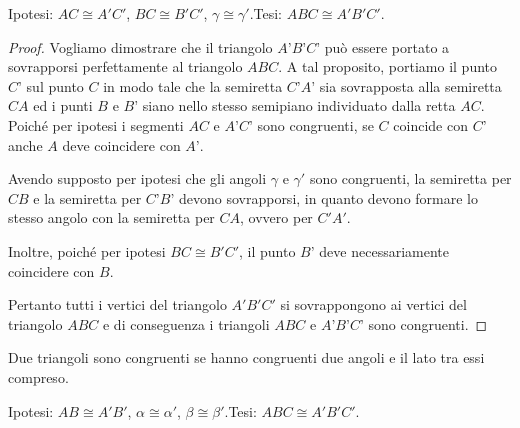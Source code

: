 \noindent Ipotesi: $AC\cong A'C'$, $BC\cong B'C'$, $\gamma \cong \gamma'$.\tab Tesi:  $ABC \cong A'B'C'$.

\begin{proof}
Vogliamo dimostrare che il triangolo $A’B’C’$ può essere portato a sovrapporsi perfettamente al triangolo $ABC$.
A tal proposito, portiamo il punto $C’$ sul punto $C$ in modo tale che la semiretta $C’A’$ sia sovrapposta alla semiretta $CA$ ed i punti $B$ e $B’$ siano nello stesso semipiano individuato dalla retta $AC$.
Poiché per ipotesi i segmenti $AC$ e $A’C’$ sono congruenti, se $C$ coincide con $C’$ anche $A$ deve coincidere con $A’$.

Avendo supposto per ipotesi che gli angoli $\gamma$ e $\gamma'$ sono congruenti, la semiretta per $CB$ e la semiretta per $C’B’$ devono sovrapporsi, in quanto devono formare lo stesso angolo con la semiretta per $CA$, ovvero per $C'A'$.

Inoltre, poiché per ipotesi $BC\cong B'C'$, il punto $B’$ deve necessariamente coincidere con $B$.

Pertanto tutti i vertici del triangolo $A'B'C'$ si sovrappongono ai vertici del triangolo $ABC$ e di conseguenza i triangoli $ABC$ e $A’B’C’$ sono congruenti.
\end{proof}

\begin{teorema}
Due triangoli sono congruenti se hanno congruenti due angoli e il lato tra essi compreso.
\end{teorema}

\begin{figure}[htb]
\centering
\end{figure}

\noindent Ipotesi: $AB\cong A'B'$, $\alpha\cong \alpha'$, $\beta \cong \beta'$.\tab Tesi:  $ABC \cong A'B'C'$.


